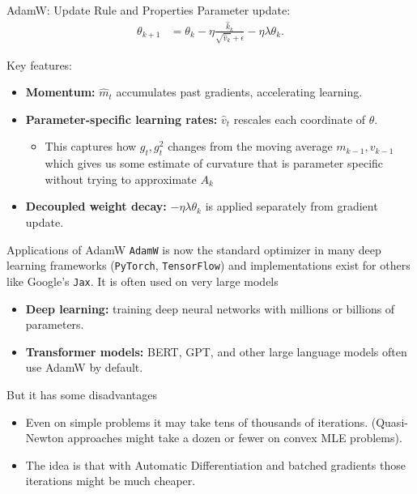 \documentclass[aspectratio=169,11pt]{beamer}
\begin{document}
\begin{frame}{AdamW: Update Rule and Properties}
Parameter update:
\begin{align}
    \theta_{k+1} 
    &= \theta_k 
    - \eta \frac{\hat{k}_k}{\sqrt{\hat{v}_k} + \epsilon}
    - \eta \lambda \theta_k.
\end{align}

Key features:
\begin{itemize}
    \item \textbf{Momentum:} $\hat{m}_t$ accumulates past gradients, accelerating learning.
    \item \textbf{Parameter-specific learning rates:} $\hat{v}_t$ rescales each coordinate of $\theta$.
    \begin{itemize}
    	\item This captures how $g_t,g_t^2$ changes from the moving average $m_{k-1},v_{k-1}$ which gives us some estimate of curvature that is parameter specific without trying to approximate $A_k$
    \end{itemize}
    \item \textbf{Decoupled weight decay:} $-\eta \lambda \theta_k$ is applied separately from gradient update.
\end{itemize}
\end{frame}

\begin{frame}{Applications of AdamW}
\texttt{AdamW} is now the standard optimizer in many deep learning frameworks (\texttt{PyTorch}, \texttt{TensorFlow}) and implementations exist for others like Google's \texttt{Jax}. It is often used on very large models
\begin{itemize}
    \item \textbf{Deep learning:} training deep neural networks with millions or billions of parameters.
    \item \textbf{Transformer models:} BERT, GPT, and other large language models often use AdamW by default.
\end{itemize}
But it has some disadvantages
\begin{itemize}
	\item Even on simple problems it may take tens of thousands of iterations. (Quasi-Newton approaches might take a dozen or fewer on convex MLE problems).
	\item The idea is that with \alert{Automatic Differentiation} and \alert{batched gradients} those iterations might be much cheaper.
\end{itemize}



\vspace{0.3cm}
\centering
\end{frame}
\end{document}
